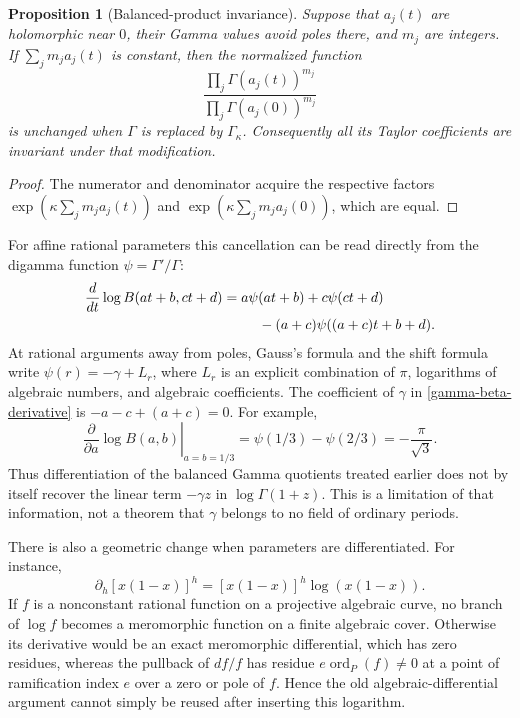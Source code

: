 \documentclass[11pt,a4paper]{article}
\newtheorem{proposition}[theorem]{Proposition}
\theoremstyle{definition}
\theoremstyle{remark}
\numberwithin{equation}{section}
\begin{document}
\begin{proposition}[Balanced-product invariance]
\label{gamma-balance-prop}
Suppose that $a_j(t)$ are holomorphic near $0$, their Gamma values avoid
poles there, and $m_j$ are integers. If
$\sum_jm_ja_j(t)$ is constant, then the normalized function
\[
 \frac{\prod_j\Gamma(a_j(t))^{m_j}}
      {\prod_j\Gamma(a_j(0))^{m_j}}
\]
is unchanged when $\Gamma$ is replaced by $\Gamma_\kappa$.
Consequently all its Taylor coefficients are invariant under that
modification.
\end{proposition}
\begin{proof}
The numerator and denominator acquire the respective factors
$\exp(\kappa\sum_jm_ja_j(t))$ and
$\exp(\kappa\sum_jm_ja_j(0))$, which are equal.
\end{proof}

For affine rational parameters this cancellation can be read directly
from the digamma function $\psi=\Gamma'/\Gamma$:
\begin{align}
 \frac{d}{dt}\log B(at+b,ct+d)
 &=a\psi(at+b)+c\psi(ct+d)\notag\\
 &\hspace{9mm}-(a+c)\psi((a+c)t+b+d).
 \label{gamma-beta-derivative}
\end{align}
At rational arguments away from poles, Gauss's formula and the shift
formula write $\psi(r)=-\gamma+L_r$, where $L_r$ is an explicit
combination of $\pi$, logarithms of algebraic numbers, and algebraic
coefficients. The coefficient of $\gamma$ in
\eqref{gamma-beta-derivative} is $-a-c+(a+c)=0$. For example,
\[
 \left.\frac{\partial}{\partial a}\log B(a,b)\right|_{a=b=1/3}
 =\psi(1/3)-\psi(2/3)=-\frac{\pi}{\sqrt3}.
\]
Thus differentiation of the balanced Gamma quotients treated earlier
does not by itself recover the linear term $-\gamma z$ in
$\log\Gamma(1+z)$. This is a limitation of that information, not a
theorem that $\gamma$ belongs to no field of ordinary periods.

There is also a geometric change when parameters are differentiated.
For instance,
\[
 \partial_h[x(1-x)]^h=[x(1-x)]^h\log(x(1-x)).
\]
If $f$ is a nonconstant rational function on a projective algebraic
curve, no branch of $\log f$ becomes a meromorphic function on a finite
algebraic cover. Otherwise its derivative would be an exact meromorphic
differential, which has zero residues, whereas the pullback of $df/f$
has residue $e\operatorname{ord}_P(f)\ne0$ at a point of ramification
index $e$ over a zero or pole of $f$. Hence the old algebraic-differential
argument cannot simply be reused after inserting this logarithm.
\end{document}
